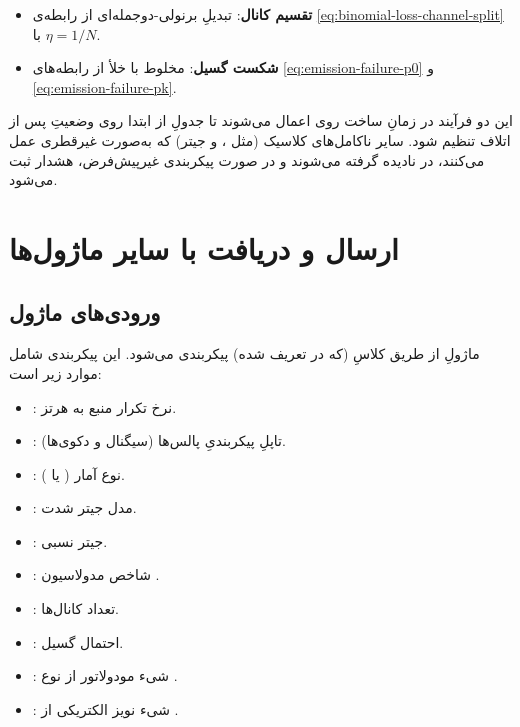 \begin{itemize}
	\item \textbf{تقسیم کانال}: تبدیلِ برنولی-دوجمله‌ای از رابطه‌ی \eqref{eq:binomial-loss-channel-split} با $\eta = 1/N$.
	\item \textbf{شکست گسیل}: مخلوط با خلأ از رابطه‌های \eqref{eq:emission-failure-p0} و \eqref{eq:emission-failure-pk}.
\end{itemize}

این دو فرآیند در زمانِ ساخت روی  اعمال می‌شوند تا جدولِ از ابتدا روی وضعیتِ پس از اتلاف تنظیم شود. سایر ناکامل‌های کلاسیک (مثل ،  و جیتر) که به‌صورت غیرقطری عمل می‌کنند، در  نادیده گرفته می‌شوند و در صورت پیکربندی غیرپیش‌فرض، هشدار ثبت می‌شود.

\section{ارسال و دریافت با سایر ماژول‌ها}
\label{sec:sources-interfacing}

\subsection{ورودی‌های ماژول}

ماژولِ  از طریق کلاسِ  (که در  تعریف شده) پیکربندی می‌شود. این پیکربندی شامل موارد زیر است:
\begin{itemize}
	\item {}: نرخ تکرار منبع به هرتز.
	\item {}: تاپلِ پیکربندیِ پالس‌ها (سیگنال و دکوی‌ها).
	\item {}: نوع آمار ( یا ).
	\item {}: مدل جیتر شدت.
	\item {}: جیتر نسبی.
	\item {}: شاخص مدولاسیون .
	\item {}: تعداد کانال‌ها.
	\item {}: احتمال گسیل.
	\item {}: شیء مودولاتور  از نوع .
	\item {}: شیء نویز الکتریکی از .
\end{itemize}

